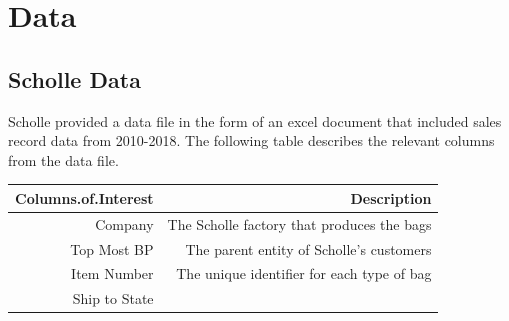 \documentclass[12pt,oneside]{chicagocapstone}
\begin{document}
\section*{Data}\label{methodology-data}

\subsection*{Scholle Data}\label{methodology-scholle}

Scholle provided a data file in the form of an excel document that
included sales record data from 2010-2018. The following table describes
the relevant columns from the data file.
\begin{longtable}[]{@{}rr@{}}
\toprule
\begin{minipage}[b]{0.15\columnwidth}\raggedleft\strut
Columns.of.Interest\strut
\end{minipage} & \begin{minipage}[b]{0.79\columnwidth}\raggedleft\strut
Description\strut
\end{minipage}\tabularnewline
\midrule
\endhead
\begin{minipage}[t]{0.15\columnwidth}\raggedleft\strut
Company\strut
\end{minipage} & \begin{minipage}[t]{0.79\columnwidth}\raggedleft\strut
The Scholle factory that produces the bags\strut
\end{minipage}\tabularnewline
\begin{minipage}[t]{0.15\columnwidth}\raggedleft\strut
Top Most BP\strut
\end{minipage} & \begin{minipage}[t]{0.79\columnwidth}\raggedleft\strut
The parent entity of Scholle's customers\strut
\end{minipage}\tabularnewline
\begin{minipage}[t]{0.15\columnwidth}\raggedleft\strut
Item Number\strut
\end{minipage} & \begin{minipage}[t]{0.79\columnwidth}\raggedleft\strut
The unique identifier for each type of bag\strut
\end{minipage}\tabularnewline
\begin{minipage}[t]{0.15\columnwidth}\raggedleft\strut
Ship to State\strut
\end{minipage} & \begin{minipage}[t]{0.79\columnwidth}\raggedleft\strut

\end{minipage}
\end{longtable}
\end{document}
